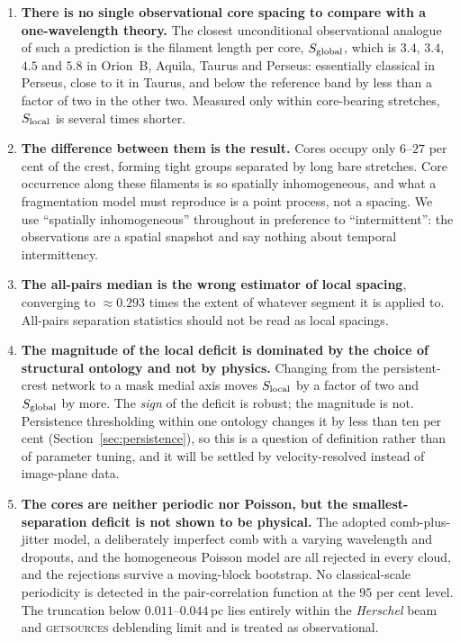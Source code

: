 \documentclass[usenatbib,twoside,twocolumn]{mnras}
\begin{document}
\begin{enumerate}\setlength{\itemsep}{2pt}
\item \textbf{There is no single observational core spacing to compare with a one-wavelength theory.} The closest unconditional observational analogue of such a prediction is the filament length per core, $S_{\rm global}$, which is $3.4$, $3.4$, $4.5$ and $5.8$ in Orion~B, Aquila, Taurus and Perseus: essentially classical in Perseus, close to it in Taurus, and below the reference band by less than a factor of two in the other two. Measured only within core-bearing stretches, $S_{\rm local}$ is several times shorter.
\item \textbf{The difference between them is the result.} Cores occupy only $6$--$27$ per cent of the crest, forming tight groups separated by long bare stretches. Core occurrence along these filaments is so spatially inhomogeneous, and what a fragmentation model must reproduce is a point process, not a spacing. We use ``spatially inhomogeneous'' throughout in preference to ``intermittent'': the observations are a spatial snapshot and say nothing about temporal intermittency.
\item \textbf{The all-pairs median is the wrong estimator of local spacing}, converging to $\approx0.293$ times the extent of whatever segment it is applied to. All-pairs separation statistics should not be read as local spacings.
\item \textbf{The magnitude of the local deficit is dominated by the choice of structural ontology and not by physics.} Changing from the persistent-crest network to a mask medial axis moves $S_{\rm local}$ by a factor of two and $S_{\rm global}$ by more. The \emph{sign} of the deficit is robust; the magnitude is not. Persistence thresholding within one ontology changes it by less than ten per cent (Section~\ref{sec:persistence}), so this is a question of definition rather than of parameter tuning, and it will be settled by velocity-resolved  instead of image-plane data.
\item \textbf{The cores are neither periodic nor Poisson, but the smallest-separation deficit is not shown to be physical.} The adopted comb-plus-jitter model, a deliberately imperfect comb with a varying wavelength and dropouts, and the homogeneous Poisson model are all rejected in every cloud, and the rejections survive a moving-block bootstrap. No classical-scale periodicity is detected in the pair-correlation function at the $95$ per cent level. The truncation below $0.011$--$0.044$\,pc lies entirely within the \textit{Herschel} beam and \textsc{getsources} deblending limit and is treated as observational.

\end{enumerate}
\end{document}
